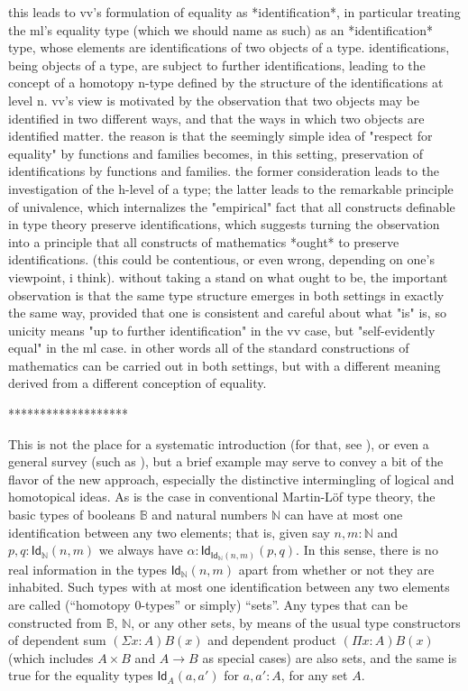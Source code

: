 \documentclass[11pt]{article}
\newcommand{\B}{\ensuremath{\mathbb{B}}}
\newcommand{\N}{\ensuremath{\mathbb{N}}}
\newcommand{\Id}{\mathsf{Id}}
\newcommand{\id}[1]{\Id_{#1}}
\theoremstyle{remark}
\theoremstyle{definition}
\begin{document}
this leads to vv's formulation of equality as *identification*, in particular treating the ml's equality type (which we should name as such) as an *identification* type, whose elements are identifications of two objects of a type.  identifications, being objects of a type, are subject to further identifications, leading to the concept of a homotopy n-type defined by the structure of the identifications at level n.  vv's view is motivated by the observation that two objects may be identified in two different ways, and that the ways in which two objects are identified matter.  the reason is that the seemingly simple idea of "respect for equality" by functions and families becomes, in this setting, preservation of identifications by functions and families.  the former consideration leads to the investigation of the h-level of a type; the latter leads to the remarkable principle of univalence, which internalizes the "empirical" fact that all constructs definable in type theory preserve identifications, which suggests turning the observation into a principle that all constructs of mathematics *ought* to preserve identifications.  (this could be contentious, or even wrong, depending on one's viewpoint, i think).  without taking a stand on what ought to be, the important observation is that the same type structure emerges in both settings in exactly the same way, provided that one is consistent and careful about what "is" is, so unicity means "up to further identification" in the vv case, but "self-evidently equal" in the ml case.  in other words all of the standard constructions of mathematics can be carried out in both settings, but with a different meaning derived from a different conception of equality.

*******************

This is not the place for a systematic introduction (for that, see \cite{HoTTbook}), or even a general survey (such as \cite{apw,pw}), but a brief example may serve to convey a bit of the flavor of the new approach, especially the distinctive intermingling of logical and homotopical ideas.  As is the case in conventional Martin-L\"of type theory, the basic types of booleans $\B$ and natural numbers $\N$ can have at most one identification between any two elements; that is, given say $n, m : \N$ and $p,q: \id{\N}(n,m)$ we always have $\alpha:\id{\id{\N}(n,m)}(p,q)$.  In this sense, there is no real information in the types $\id{\N}(n,m)$ apart from whether or not they are inhabited.  Such types with at most one identification between any two elements are called (``homotopy 0-types'' or simply) ``sets''.  Any types that can be constructed from $\B$, $\N$, or any other sets, by means of the usual type constructors of dependent sum $(\Sigma{x:A})B(x)$ and dependent product $(\Pi{x:A})B(x)$ (which includes $A\times B$ and $A\rightarrow B$ as special cases) are also sets, and the same is true for the equality types $\id{A}(a,a')$ for $a,a':A$, for any set $A$.  
\end{document}

